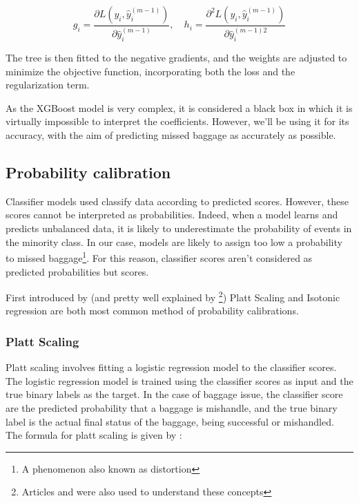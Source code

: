 \documentclass[12pt]{article}
\begin{document}
\begin{equation}\label{equa:test}
g_i = \frac{\partial L(y_i, \hat{y}_i^{(m-1)})}{\partial \hat{y}_i^{(m-1)}}, \quad h_i = \frac{\partial^2 L(y_i, \hat{y}_i^{(m-1)})}{\partial \hat{y}_i^{(m-1)2}}    
\end{equation}

 
The tree is then fitted to the negative gradients, and the weights are adjusted to minimize the objective function, incorporating both the loss and the regularization term. \hfill \break



As the XGBoost model is very complex, it is considered a black box in which it is virtually impossible to interpret the coefficients. However, we'll be using it for its accuracy, with the aim of predicting missed baggage as accurately as possible.


\subsection{Probability calibration}
\label{subsec:Probability calibration}

Classifier models used classify data according to predicted scores. However, these scores cannot be interpreted as probabilities.
Indeed, when a model learns and predicts unbalanced data, it is likely to underestimate the probability of events in the minority class. In our case, models are likely to assign too low a probability to missed baggage\footnote{A phenomenon also known as distortion}. For this reason, classifier scores aren't considered as predicted probabilities but scores. 

First introduced by \cite{Zadrozny2002} (and pretty well explained by \cite{ProbabilityCalibration}\footnote{Articles \cite{JasonBrownlee} and \cite{ExperianLatAmDataLab} were also used to understand these concepts}) Platt Scaling and Isotonic regression are both most common method of probability calibrations.

\subsubsection{Platt Scaling}
 
Platt scaling involves fitting a logistic regression model to the classifier scores. The logistic regression model is trained using the classifier scores as input and the true binary labels as the target. In the case of baggage issue, the classifier score are the predicted probability that a baggage is mishandle, and the true binary label is the actual final status of the baggage, being successful or mishandled. The formula for platt scaling is given by :
\end{document}
